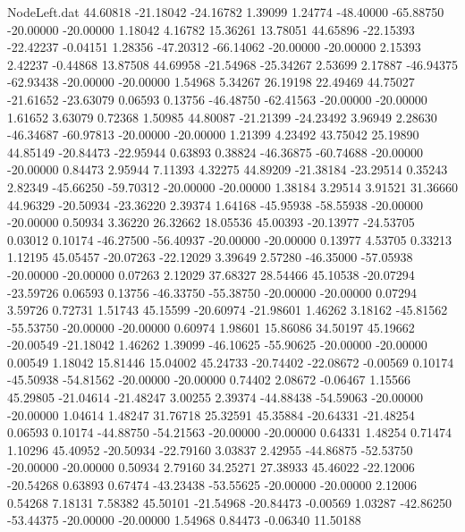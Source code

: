 \begin{filecontents}{NodeLeft.dat}
  44.60818  -21.18042  -24.16782     1.39099    1.24774  -48.40000  -65.88750  -20.00000  -20.00000    1.18042    4.16782   15.36261   13.78051
  44.65896  -22.15393  -22.42237    -0.04151    1.28356  -47.20312  -66.14062  -20.00000  -20.00000    2.15393    2.42237   -0.44868   13.87508
  44.69958  -21.54968  -25.34267     2.53699    2.17887  -46.94375  -62.93438  -20.00000  -20.00000    1.54968    5.34267   26.19198   22.49469
  44.75027  -21.61652  -23.63079     0.06593    0.13756  -46.48750  -62.41563  -20.00000  -20.00000    1.61652    3.63079    0.72368    1.50985
  44.80087  -21.21399  -24.23492     3.96949    2.28630  -46.34687  -60.97813  -20.00000  -20.00000    1.21399    4.23492   43.75042   25.19890
  44.85149  -20.84473  -22.95944     0.63893    0.38824  -46.36875  -60.74688  -20.00000  -20.00000    0.84473    2.95944    7.11393    4.32275
  44.89209  -21.38184  -23.29514     0.35243    2.82349  -45.66250  -59.70312  -20.00000  -20.00000    1.38184    3.29514    3.91521   31.36660
  44.96329  -20.50934  -23.36220     2.39374    1.64168  -45.95938  -58.55938  -20.00000  -20.00000    0.50934    3.36220   26.32662   18.05536
  45.00393  -20.13977  -24.53705     0.03012    0.10174  -46.27500  -56.40937  -20.00000  -20.00000    0.13977    4.53705    0.33213    1.12195
  45.05457  -20.07263  -22.12029     3.39649    2.57280  -46.35000  -57.05938  -20.00000  -20.00000    0.07263    2.12029   37.68327   28.54466
  45.10538  -20.07294  -23.59726     0.06593    0.13756  -46.33750  -55.38750  -20.00000  -20.00000    0.07294    3.59726    0.72731    1.51743
  45.15599  -20.60974  -21.98601     1.46262    3.18162  -45.81562  -55.53750  -20.00000  -20.00000    0.60974    1.98601   15.86086   34.50197
  45.19662  -20.00549  -21.18042     1.46262    1.39099  -46.10625  -55.90625  -20.00000  -20.00000    0.00549    1.18042   15.81446   15.04002
  45.24733  -20.74402  -22.08672    -0.00569    0.10174  -45.50938  -54.81562  -20.00000  -20.00000    0.74402    2.08672   -0.06467    1.15566
  45.29805  -21.04614  -21.48247     3.00255    2.39374  -44.88438  -54.59063  -20.00000  -20.00000    1.04614    1.48247   31.76718   25.32591
  45.35884  -20.64331  -21.48254     0.06593    0.10174  -44.88750  -54.21563  -20.00000  -20.00000    0.64331    1.48254    0.71474    1.10296
  45.40952  -20.50934  -22.79160     3.03837    2.42955  -44.86875  -52.53750  -20.00000  -20.00000    0.50934    2.79160   34.25271   27.38933
  45.46022  -22.12006  -20.54268     0.63893    0.67474  -43.23438  -53.55625  -20.00000  -20.00000    2.12006    0.54268    7.18131    7.58382
  45.50101  -21.54968  -20.84473    -0.00569    1.03287  -42.86250  -53.44375  -20.00000  -20.00000    1.54968    0.84473   -0.06340   11.50188

\end{filecontents}
